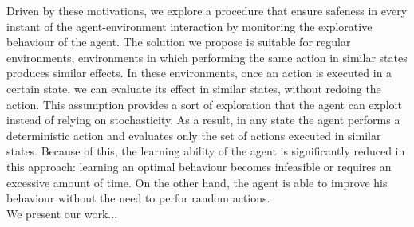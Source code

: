 Driven by these motivations, we explore a procedure that ensure safeness in every instant of the agent-environment interaction by monitoring the explorative behaviour of the agent. The solution we propose is suitable for regular environments, \ie environments in which performing the same action in similar states produces similar effects. In these environments, once an action is executed in a certain state, we can evaluate its effect in similar states, without redoing the action. This assumption provides a sort of exploration that the agent can exploit instead of relying on stochasticity. As a result, in any state the agent performs a deterministic action and evaluates only the set of actions executed in similar states. Because of this, the learning ability of the agent is significantly reduced in this approach: learning an optimal behaviour becomes infeasible or requires an excessive amount of time. On the other hand, the agent is able to improve his behaviour without the need to perfor random actions.\\
\newline
We present our work... 
